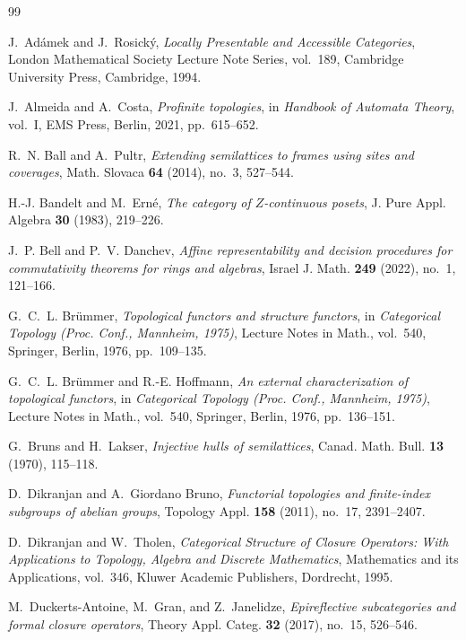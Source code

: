\documentclass[12pt,oneside,reqno]{amsart}
\theoremstyle{definition}
\theoremstyle{remark}
\begin{document}
\begin{thebibliography}{99}

J.~Ad\'{a}mek and J.~Rosick\'{y},
\emph{Locally Presentable and Accessible Categories},
London Mathematical Society Lecture Note Series, vol.~189,
Cambridge University Press, Cambridge, 1994.

J.~Almeida and A.~Costa,
\emph{Profinite topologies},
in \emph{Handbook of Automata Theory}, vol.~I,
EMS Press, Berlin, 2021, pp.~615--652.

R.~N. Ball and A.~Pultr,
\emph{Extending semilattices to frames using sites and coverages},
Math. Slovaca \textbf{64} (2014), no.~3, 527--544.

H.-J. Bandelt and M.~Ern\'{e},
\emph{The category of \(Z\)-continuous posets},
J. Pure Appl. Algebra \textbf{30} (1983), 219--226.

J.~P. Bell and P.~V. Danchev,
\emph{Affine representability and decision procedures for
commutativity theorems for rings and algebras},
Israel J. Math. \textbf{249} (2022), no.~1, 121--166.

G.~C.~L. Br\"ummer,
\emph{Topological functors and structure functors},
in \emph{Categorical Topology (Proc. Conf., Mannheim, 1975)},
Lecture Notes in Math., vol.~540, Springer, Berlin, 1976, pp.~109--135.

G.~C.~L. Br\"ummer and R.-E. Hoffmann,
\emph{An external characterization of topological functors},
in \emph{Categorical Topology (Proc. Conf., Mannheim, 1975)},
Lecture Notes in Math., vol.~540, Springer, Berlin, 1976, pp.~136--151.

G.~Bruns and H.~Lakser,
\emph{Injective hulls of semilattices},
Canad. Math. Bull. \textbf{13} (1970), 115--118.

D.~Dikranjan and A.~Giordano Bruno,
\emph{Functorial topologies and finite-index subgroups of abelian
groups},
Topology Appl. \textbf{158} (2011), no.~17, 2391--2407.

D.~Dikranjan and W.~Tholen,
\emph{Categorical Structure of Closure Operators: With Applications to
Topology, Algebra and Discrete Mathematics}, Mathematics and its
Applications, vol.~346, Kluwer Academic Publishers, Dordrecht, 1995.

M.~Duckerts-Antoine, M.~Gran, and Z.~Janelidze,
\emph{Epireflective subcategories and formal closure operators},
Theory Appl. Categ. \textbf{32} (2017), no.~15, 526--546.


\end{thebibliography}
\end{document}
